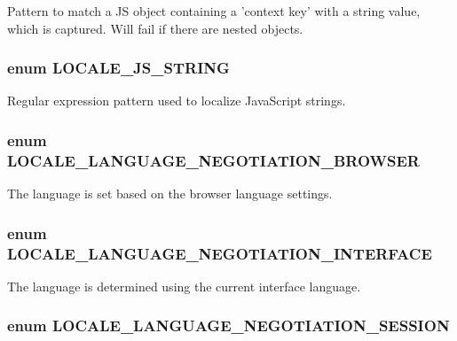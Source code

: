 Pattern to match a JS object containing a 'context key' with a string value, which is captured. Will fail if there are nested objects. \hypertarget{locale_8inc_aff21ba18b5d6e8c731ea7894feb4d29a}{
\subsubsection[{LOCALE\_\-JS\_\-STRING}]{\setlength{\rightskip}{0pt plus 5cm}enum {\bf LOCALE\_\-JS\_\-STRING}}}
\label{locale_8inc_aff21ba18b5d6e8c731ea7894feb4d29a}
Regular expression pattern used to localize JavaScript strings. \hypertarget{locale_8inc_a9817fff1ac3baeddca4e604f9e7657c8}{
\subsubsection[{LOCALE\_\-LANGUAGE\_\-NEGOTIATION\_\-BROWSER}]{\setlength{\rightskip}{0pt plus 5cm}enum {\bf LOCALE\_\-LANGUAGE\_\-NEGOTIATION\_\-BROWSER}}}
\label{locale_8inc_a9817fff1ac3baeddca4e604f9e7657c8}
The language is set based on the browser language settings. \hypertarget{locale_8inc_a8e577dfa842e544e736e4e3e5b96ed81}{
\subsubsection[{LOCALE\_\-LANGUAGE\_\-NEGOTIATION\_\-INTERFACE}]{\setlength{\rightskip}{0pt plus 5cm}enum {\bf LOCALE\_\-LANGUAGE\_\-NEGOTIATION\_\-INTERFACE}}}
\label{locale_8inc_a8e577dfa842e544e736e4e3e5b96ed81}
The language is determined using the current interface language. \hypertarget{locale_8inc_a332fbf28d5c861b2960b5ae1376e6b1e}{
\subsubsection[{LOCALE\_\-LANGUAGE\_\-NEGOTIATION\_\-SESSION}]{\setlength{\rightskip}{0pt plus 5cm}enum {\bf LOCALE\_\-LANGUAGE\_\-NEGOTIATION\_\-SESSION}}}
